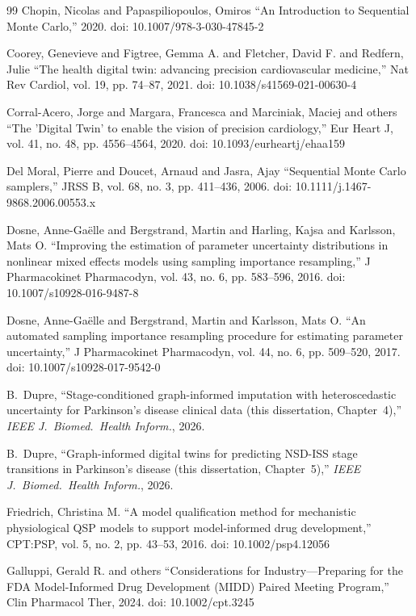\begin{thebibliography}{99}
 Chopin, Nicolas and Papaspiliopoulos, Omiros ``An Introduction to Sequential Monte Carlo,'' 2020. doi: 10.1007/978-3-030-47845-2

 Coorey, Genevieve and Figtree, Gemma A. and Fletcher, David F. and Redfern, Julie ``The health digital twin: advancing precision cardiovascular medicine,'' Nat Rev Cardiol, vol. 19, pp. 74--87, 2021. doi: 10.1038/s41569-021-00630-4

 Corral-Acero, Jorge and Margara, Francesca and Marciniak, Maciej and others ``The 'Digital Twin' to enable the vision of precision cardiology,'' Eur Heart J, vol. 41, no. 48, pp. 4556--4564, 2020. doi: 10.1093/eurheartj/ehaa159

 Del Moral, Pierre and Doucet, Arnaud and Jasra, Ajay ``Sequential Monte Carlo samplers,'' JRSS B, vol. 68, no. 3, pp. 411--436, 2006. doi: 10.1111/j.1467-9868.2006.00553.x

 Dosne, Anne-Ga\"elle and Bergstrand, Martin and Harling, Kajsa and Karlsson, Mats O. ``Improving the estimation of parameter uncertainty distributions in nonlinear mixed effects models using sampling importance resampling,'' J Pharmacokinet Pharmacodyn, vol. 43, no. 6, pp. 583--596, 2016. doi: 10.1007/s10928-016-9487-8

 Dosne, Anne-Ga\"elle and Bergstrand, Martin and Karlsson, Mats O. ``An automated sampling importance resampling procedure for estimating parameter uncertainty,'' J Pharmacokinet Pharmacodyn, vol. 44, no. 6, pp. 509--520, 2017. doi: 10.1007/s10928-017-9542-0

B.~Dupre, ``Stage-conditioned graph-informed imputation with heteroscedastic uncertainty for Parkinson's disease clinical data (this dissertation, Chapter~4),'' \textit{IEEE J.\ Biomed.\ Health Inform.}, 2026.

B.~Dupre, ``Graph-informed digital twins for predicting NSD-ISS stage transitions in Parkinson's disease (this dissertation, Chapter~5),'' \textit{IEEE J.\ Biomed.\ Health Inform.}, 2026.

 Friedrich, Christina M. ``A model qualification method for mechanistic physiological QSP models to support model-informed drug development,'' CPT:PSP, vol. 5, no. 2, pp. 43--53, 2016. doi: 10.1002/psp4.12056

 Galluppi, Gerald R. and others ``Considerations for Industry---Preparing for the FDA Model-Informed Drug Development (MIDD) Paired Meeting Program,'' Clin Pharmacol Ther, 2024. doi: 10.1002/cpt.3245


\end{thebibliography}

